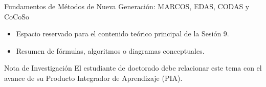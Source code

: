 \documentclass[aspectratio=169, 10pt]{beamer}
\begin{document}
\begin{frame}{Fundamentos de Métodos de Nueva Generación: MARCOS, EDAS, CODAS y CoCoSo}
    \begin{itemize}
        \item Espacio reservado para el contenido teórico principal de la Sesión 9.
        \item Resumen de fórmulas, algoritmos o diagramas conceptuales.
    \end{itemize}
    \begin{block}{Nota de Investigación}
        El estudiante de doctorado debe relacionar este tema con el avance de su Producto Integrador de Aprendizaje (PIA).
    \end{block}
\end{frame}
\end{document}
